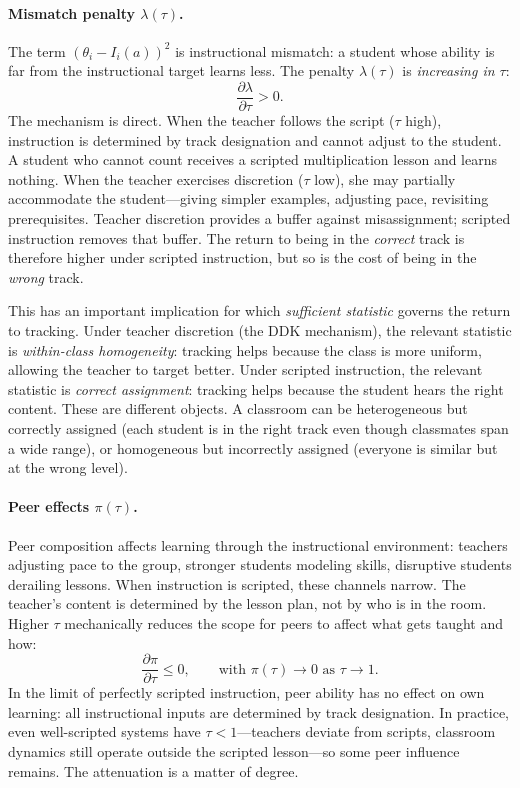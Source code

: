 \documentclass[11pt]{article}
\begin{document}
\paragraph{Mismatch penalty $\lambda(\tau)$.} The term $(\theta_i - I_i(a))^2$ is instructional mismatch: a student whose ability is far from the instructional target learns less. The penalty $\lambda(\tau)$ is \emph{increasing in $\tau$}:
\begin{equation}
\label{eq:lambda_tau}
\frac{\partial \lambda}{\partial \tau} > 0.
\end{equation}
The mechanism is direct. When the teacher follows the script ($\tau$ high), instruction is determined by track designation and cannot adjust to the student. A student who cannot count receives a scripted multiplication lesson and learns nothing. When the teacher exercises discretion ($\tau$ low), she may partially accommodate the student---giving simpler examples, adjusting pace, revisiting prerequisites. Teacher discretion provides a buffer against misassignment; scripted instruction removes that buffer. The return to being in the \emph{correct} track is therefore higher under scripted instruction, but so is the cost of being in the \emph{wrong} track.

This has an important implication for which \emph{sufficient statistic} governs the return to tracking. Under teacher discretion (the DDK mechanism), the relevant statistic is \emph{within-class homogeneity}: tracking helps because the class is more uniform, allowing the teacher to target better. Under scripted instruction, the relevant statistic is \emph{correct assignment}: tracking helps because the student hears the right content. These are different objects. A classroom can be heterogeneous but correctly assigned (each student is in the right track even though classmates span a wide range), or homogeneous but incorrectly assigned (everyone is similar but at the wrong level).

\paragraph{Peer effects $\pi(\tau)$.} Peer composition affects learning through the instructional environment: teachers adjusting pace to the group, stronger students modeling skills, disruptive students derailing lessons. When instruction is scripted, these channels narrow. The teacher's content is determined by the lesson plan, not by who is in the room. Higher $\tau$ mechanically reduces the scope for peers to affect what gets taught and how:
\begin{equation}
\label{eq:pi_tau}
\frac{\partial \pi}{\partial \tau} \leq 0, \qquad \text{with } \pi(\tau) \to 0 \text{ as } \tau \to 1.
\end{equation}
In the limit of perfectly scripted instruction, peer ability has no effect on own learning: all instructional inputs are determined by track designation. In practice, even well-scripted systems have $\tau < 1$---teachers deviate from scripts, classroom dynamics still operate outside the scripted lesson---so some peer influence remains. The attenuation is a matter of degree.
\end{document}
